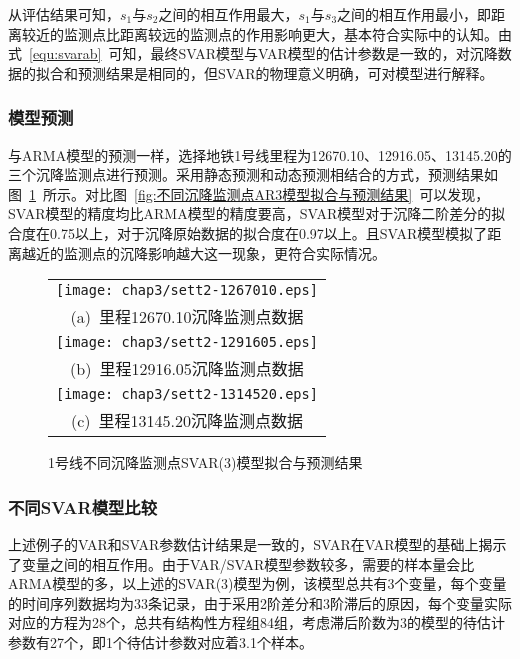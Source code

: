 从评估结果可知，$s_1$与$s_2$之间的相互作用最大，$s_1$与$s_3$之间的相互作用最小，即距离较近的监测点比距离较远的监测点的作用影响更大，基本符合实际中的认知。由式~\ref{equ:svarab}~可知，最终SVAR模型与VAR模型的估计参数是一致的，对沉降数据的拟合和预测结果是相同的，但SVAR的物理意义明确，可对模型进行解释。

\subsubsection{模型预测}

与ARMA模型的预测一样，选择地铁1号线里程为12670.10、12916.05、13145.20的三个沉降监测点进行预测。采用静态预测和动态预测相结合的方式，预测结果如图~\ref{fig:不同沉降监测点SVAR3模型拟合与预测结果}~所示。对比图~\ref{fig:不同沉降监测点AR3模型拟合与预测结果}~可以发现，SVAR模型的精度均比ARMA模型的精度要高，SVAR模型对于沉降二阶差分的拟合度在0.75以上，对于沉降原始数据的拟合度在0.97以上。且SVAR模型模拟了距离越近的监测点的沉降影响越大这一现象，更符合实际情况。

\begin{figure}[htbp] 
    \centering 
    \begin{tabular}{c} 
        \texttt{[image: chap3/sett2-1267010.eps]} \\ 
        (a)~里程12670.10沉降监测点数据 \\
        \texttt{[image: chap3/sett2-1291605.eps]} \\ 
        (b)~里程12916.05沉降监测点数据 \\
        \texttt{[image: chap3/sett2-1314520.eps]} \\ 
        (c)~里程13145.20沉降监测点数据 \\
    \end{tabular}
    \caption{1号线不同沉降监测点SVAR(3)模型拟合与预测结果} 
    \label{fig:不同沉降监测点SVAR3模型拟合与预测结果} 
\end{figure}

\subsubsection{不同SVAR模型比较}

上述例子的VAR和SVAR参数估计结果是一致的，SVAR在VAR模型的基础上揭示了变量之间的相互作用。由于VAR/SVAR模型参数较多，需要的样本量会比ARMA模型的多，以上述的SVAR(3)模型为例，该模型总共有3个变量，每个变量的时间序列数据均为33条记录，由于采用2阶差分和3阶滞后的原因，每个变量实际对应的方程为28个，总共有结构性方程组84组，考虑滞后阶数为3的模型的待估计参数有27个，即1个待估计参数对应着3.1个样本。

